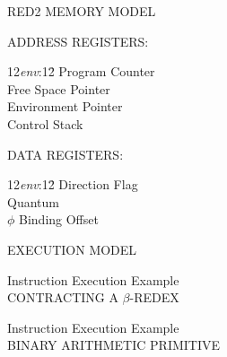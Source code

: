 \begin{slide}{}
\begin{center}
RED2 MEMORY MODEL
\end{center}

\vspace*{2in}

ADDRESS REGISTERS:
\begin{tabbing}
12\={\em env}:12\=\kill
{} \> Program Counter\\
 \> Free Space Pointer\\
 \> Environment Pointer\\
 \> Control Stack
\end{tabbing}

DATA REGISTERS:
\begin{tabbing}
12\={\em env}:12\=\kill
{} \> Direction Flag\\
 \> Quantum\\
\>$\phi$ \> Binding Offset\\[1em]
\end{tabbing}
\end{slide}


\begin{slide}{}
\begin{center}
EXECUTION MODEL
\end{center}
\vspace*{\fill}
\end{slide}

\begin{slide}{}
\begin{center}
Instruction Execution Example\\[.5em]
CONTRACTING A $\beta$-REDEX\\[2em] 
\end{center}
\vspace*{\fill}
\end{slide}


\begin{slide}{}
\begin{center}
Instruction Execution Example\\[.5em]
BINARY ARITHMETIC PRIMITIVE\\[2em]
\end{center}
\vspace*{\fill}
\end{slide}


